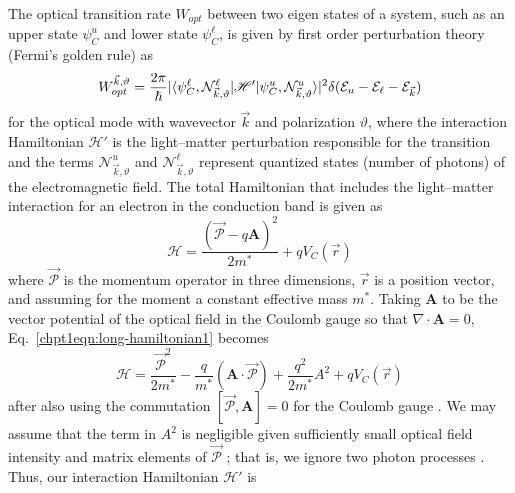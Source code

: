 \documentclass[12pt]{report}
\begin{document}
{The optical transition rate $W_{opt}$ between two eigen states of a system, such as an upper state $\psi_C^u$ and lower state $\psi_C^\ell$, is given by first order perturbation theory (Fermi's golden rule) as \cite{CohenTannoudji}
\begin{equation}
\label{chpt1eqn:fermi_golden_rule1}
W_{opt}^{\vec{k},\vartheta} = \frac{2 \pi}{\hslash} \vert\langle \psi_C^\ell,\mathcal{N}^\ell_{\vec{k},\vartheta} \vert \mathscr{H}'\vert \psi_C^u,\mathcal{N}^u_{\vec{k},\vartheta}  \rangle\vert^2 \delta(\EE_u-\EE_\ell-\EE_{\vec{k}})
\end{equation}
for the optical mode with wavevector $\vec{k}$ and polarization $\vartheta$,
where the interaction Hamiltonian $\mathscr{H}'$ is the light--matter perturbation responsible for the transition and the terms $\mathcal{N}^u_{\vec{k},\vartheta}$ and $\mathcal{N}^\ell_{\vec{k},\vartheta}$ represent quantized states (number of photons) of the electromagnetic field. %
The total Hamiltonian that includes the light--matter interaction for an electron in the conduction band is given as \cite{CohenTannoudji}
\begin{equation}
\label{chpt1eqn:long-hamiltonian1}
\mathscr{H}=\frac{\left(\vec{\mathcal{P}}-q {\textbf{A}}\right)^2}{2 m^*} + q V_C(\vec{r})
\end{equation}
where $\vec{\mathcal{P}}$ is the momentum operator in three dimensions, $\vec{r}$ is a position vector, and assuming for the moment a constant effective mass $m^*$.
Taking ${\textbf{A}}$ to be the vector potential of the optical field in the Coulomb gauge so that $\nabla\cdot {\textbf{A}}=0$, Eq.~\eqref{chpt1eqn:long-hamiltonian1} becomes
\begin{equation}
\label{chpt1eqn:long-hamiltonian2}
\mathscr{H} = \frac{\vec{\mathcal{P}}^2}{2 m^*} -\frac{q}{m^*}\left(\textbf{{A}} \cdot \vec{\mathcal{P}} \right) + \frac{q^2}{2 m^*} A^2 + q V_C(\vec{r})
\end{equation}
after also using the commutation $[\vec{\mathcal{P}},{\textbf{A}}]=0$ for the Coulomb gauge \cite{CohenTannoudji}.  We may assume that the term in $A^2$ is negligible given sufficiently small optical field intensity and matrix elements of $\vec{\mathcal{P}}$ \cite{Yariv:book:1989}; that is, we ignore two photon processes \cite{Parker:book:2005}.  Thus, our interaction Hamiltonian $\mathscr{H}'$ is
}
\end{document}
